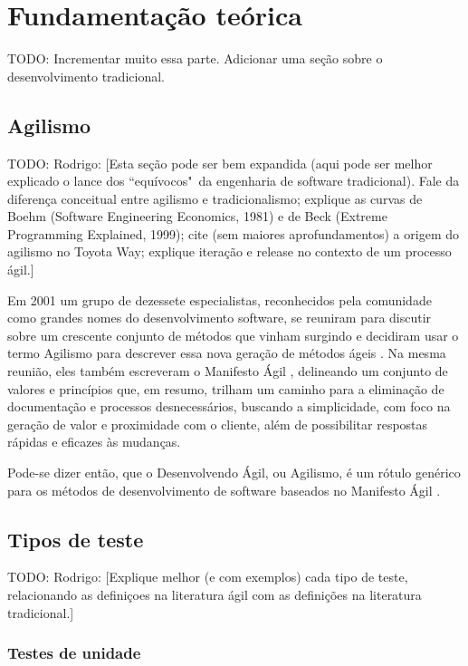 \chapter{Fundamentação teórica}

TODO: Incrementar muito essa parte. Adicionar uma seção sobre o desenvolvimento tradicional.

\section{Agilismo}
\label{sec:agilismo}

TODO: Rodrigo: [Esta seção pode ser bem expandida (aqui pode ser melhor explicado o lance dos ``equívocos"\ da engenharia de software tradicional). Fale da diferença conceitual entre agilismo e tradicionalismo; explique as curvas de Boehm (Software Engineering Economics, 1981) e de Beck (Extreme Programming Explained, 1999); cite (sem maiores aprofundamentos) a origem do agilismo no Toyota Way; explique iteração e release no contexto de um processo ágil.]

Em 2001 um grupo de dezessete especialistas, reconhecidos pela comunidade como grandes nomes do desenvolvimento software, se reuniram para discutir sobre um crescente conjunto de métodos que vinham surgindo e decidiram usar o termo Agilismo para descrever essa nova geração de métodos ágeis \cite{AgileStory}. Na mesma reunião, eles também escreveram o Manifesto Ágil \cite{AgileManifesto}, delineando um conjunto de valores e princípios que, em resumo, trilham um caminho para a eliminação de documentação e processos desnecessários, buscando a simplicidade, com foco na geração de valor e proximidade com o cliente, além de possibilitar respostas rápidas e eficazes às mudanças.

Pode-se dizer então, que o Desenvolvendo Ágil, ou Agilismo, é um rótulo genérico para os métodos de desenvolvimento de software baseados no Manifesto Ágil \cite{BDDRodrigo}.


\section{Tipos de teste}
\label{sec:tipos_de_teste}

TODO: Rodrigo: [Explique melhor (e com exemplos) cada tipo de teste, relacionando as definiçoes na literatura ágil com as definições na literatura tradicional.]

\subsection{Testes de unidade}
\label{sub:testes_de_unidade}

